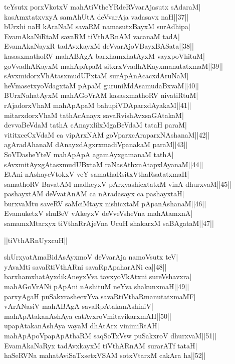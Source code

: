 \documentclass{article}
\begin{document}
teYsutx porxVkotxV mahAtiVtheYRdeRVvarAjasutx sAdaraM|\\
kasAmxtatxvxyA samAhUtA deVvarAja vadasavx naH||37||\\
bUrxhi naH kAraNaM savaRM namasutxBayxM surAdhipa|\\
EvamAkaNiRtaM savaRM tiVthARnAM vacanaM tadA|\\
EvamAkaNayxR tadAvxkayxM deVvarAjoVBayxBASata||38||\\
kasasxmathoRV mahABAgA barxhamxhatAyxM vayxpoVhituM|\\
goVvadhAKayxM mahApApaM sitxrxVvadhAKayxmanutatxmaM||39||\\
sAvxmidorxVhAtasxmudUPxtaM surApAnAcacxdAruNaM|\\
heVmasetxyoVdagxtaM pApaM guruniMdAsamudaBxvaM||40||\\
BUrxNahatAyxM mahAGoVrAM kasasxmathoRV nivatiRtuM|\\
rAjadorxVhaM mahApApaM bahupiVDAparxdAyakaM||41||\\
mitarxdorxVhaM tathAcAnayx savaRvishAvxsaGAtakaM|\\
devvaBeVdaM tathA cAnayxlilxMgaBeVdaM tataH paraM|\\
vititxceCxVdaM ca vipArxNAM goVparxcAraparxNAshanaM||42||\\
agAradAhanaM dAnayxdAgxrxmadiVpanakaM paraM||43||\\
SoVDasheYteV mahApApA agamAyxgamanaM tathA|\\
sAvxmitAyxgAtasxmudUBxtaM raNasAthxnAtapxlAyanaM||44||\\
EtAni nAshayeVtokxV veY samathaRsitxVthaRsatatxmaH|\\
samathoRV BavatAM madheyxV pArxyashicxtatxM vinA dhurxvaM||45||\\
pashayxtAM deVvatAnAM ca nAradasayx ca pashayxtaH|\\
burxvaMtu saveRV saMciMtayx nishicxtaM pApanAshanaM||46||\\
EvamuketxV shuBeV vAkeyxV deVveVsheVna mahAtamxnA|\\
samamxMtarxyx tiVthaRrAjeVna UcuH shakarxM saBAgataM||47||\\

\begin{center}
||tiVthARnUyxcuH||
\end{center}

shUrxyatAmaBidAsAyxmoV deVvarAja namoVsutx teV|\\
yAvaMti savaRtiVthARni savaRpApaharANi ca||48||\\
barxhamxhatAyxdikAneyxVva tavxyoVkAtxni sureVshavxra|\\
mahAGoVrANi pApAni nAshituM neYva shakunxmaH||49||\\
parxyAgaH puSakxrashecxYva savaRtiVthaRmanutatxmaMF|\\
vArANasiV mahABAgA savaRpAtakanAshiniV|\\
mahApAtakanAshAya catAvxroVmitavikarxmAH||50||\\
upapAtakanAshAya vayaM dhAtArx vinimiRtAH|\\
mahApApoVpapApAthaRM saqSoTxVsw puSakxroV dhurxvaM||51||\\
EvamAkaNaRyx tadAvxkayxM tiVthARnAM surarATf tataH|\\
haSeRVNa mahatAviSaTxsetxVSAM sotxVtarxM cakAra ha||52||
\end{document}
